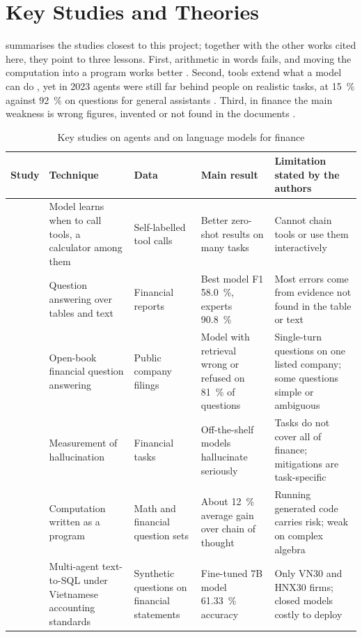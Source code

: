 \section{Key Studies and Theories}\label{sec:studies}
 summarises the studies closest to this project; together with the other works cited here, they point to three lessons.
First, arithmetic in words fails, and moving the computation into a program works better \parencite{chen2023program}.
Second, tools extend what a model can do \parencite{schick2023toolformer,qin2024toolllm}, yet in 2023 agents were still far behind people on realistic tasks, at \qty{15}{\percent} against \qty{92}{\percent} on questions for general assistants \parencite{mialon2024gaia}.
Third, in finance the main weakness is wrong figures, invented or not found in the documents \parencite{islam2023financebench,kang2023deficiency}.

\begin{table}[H]
  \centering
  \caption{Key studies on agents and on language models for finance}\label{tab:key-studies}
  \begin{tabularx}{\textwidth}{@{}L L L L L@{}}
    \toprule
    {Study} & {Technique} & {Data} & {Main result} & {Limitation stated by the authors}\\
    \midrule
    \textcite{schick2023toolformer} & Model learns when to call tools, a calculator among them & Self-labelled tool calls & Better zero-shot results on many tasks & Cannot chain tools or use them interactively\\
    \textcite{zhu2021tatqa} & Question answering over tables and text & Financial reports & Best model F1 \qty{58.0}{\percent}, experts \qty{90.8}{\percent} & Most errors come from evidence not found in the table or text\\
    \textcite{islam2023financebench} & Open-book financial question answering & Public company filings & Model with retrieval wrong or refused on \qty{81}{\percent} of questions & Single-turn questions on one listed company; some questions simple or ambiguous\\
    \textcite{kang2023deficiency} & Measurement of hallucination & Financial tasks & Off-the-shelf models hallucinate seriously & Tasks do not cover all of finance; mitigations are task-specific\\
    \textcite{chen2023program} & Computation written as a program & Math and financial question sets & About \qty{12}{\percent} average gain over chain of thought & Running generated code carries risk; weak on complex algebra\\
    \textcite{nguyen2025finstat2sql} & Multi-agent text-to-SQL under Vietnamese accounting standards & Synthetic questions on financial statements & Fine-tuned 7B model \qty{61.33}{\percent} accuracy & Only VN30 and HNX30 firms; closed models costly to deploy\\
    \bottomrule
  \end{tabularx}
\end{table}

